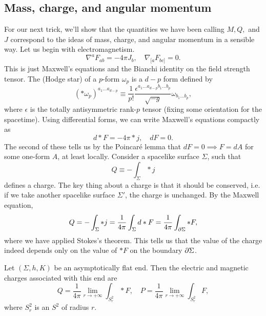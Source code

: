 \subsection*{Mass, charge, and angular momentum}
For our next trick, we'll show that the quantities we have been calling $M,Q,$ and $J$ correspond to the ideas of mass, charge, and angular momentum in a sensible way. Let us begin with electromagnetism.
\begin{equation}
    \nabla^a F_{ab}=-4\pi J_b, \quad \nabla_{[a}F_{bc]}=0.
\end{equation}
This is just Maxwell's equations and the Bianchi identity on the field strength tensor. The  (Hodge star) of a $p$-form $\omega_p$ is a $d-p$ form defined by
\begin{equation}
    (* \omega_p)^{a_1 \ldots a_{d-p}} \equiv \frac{1}{p!} \frac{\epsilon^{a_1 \ldots a_{d-p} b_1 \ldots b_p}}{\sqrt{-g}} \omega_{b_1\ldots b_p},
\end{equation}
where $\epsilon$ is the totally antisymmetric rank-$p$ tensor (fixing some orientation for the spacetime). Using differential forms, we can write Maxwell's equations compactly as
\begin{equation}
    d*F = -4\pi * j, \quad dF=0.
\end{equation}
The second of these tells us by the Poincar\'e lemma that $dF=0\implies F=dA$ for some one-form $A$, at least locally. Consider a spacelike surface $\Sigma$, such that
\begin{equation}
    Q \equiv -\int_\Sigma * j
\end{equation}
defines a charge. The key thing about a charge is that it should be conserved, i.e. if we take another spacelike surface $\Sigma'$, the charge is unchanged. By the Maxwell equation,
\begin{equation}
    Q = -\int_\Sigma * j = \frac{1}{4\pi} \int_\Sigma d* F =\frac{1}{4\pi} \int_{\partial \Sigma} *F,
\end{equation}
where we have applied Stokes's theorem. This tells us that the value of the charge indeed depends only on the value of $*F$ on the boundary $\partial \Sigma$.
\begin{defn}
    Let $(\Sigma,h,K)$ be an asymptotically flat end. Then the electric and magnetic charges associated with this end are
    \begin{equation}
        Q=\frac{1}{4\pi} \lim_{r\to +\infty} \int_{S^2_r} *F,\quad P= \frac{1}{4\pi} \lim_{r\to + \infty}\int_{S^2_r} F,
    \end{equation}
    where $S_r^2$ is an $S^2$ of radius $r$.
\end{defn}

